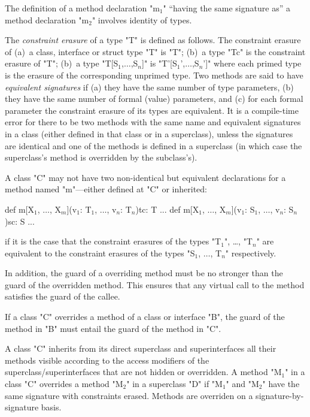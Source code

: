 The definition of a method declaration \xcdmath"m$_1$" ``having the same signature
as'' a method declaration \xcdmath"m$_2$" involves identity of types. 


The {\em constraint erasure} of a type \xcdmath"T" is defined as follows.
The constraint erasure of  (a)~a class, interface or struct type \xcdmath"T" is 
\xcdmath"T"; (b)~a type \xcdmath"T{c}" is the constraint erasure of 
\xcdmath"T"; (b)~a type \xcdmath"T[S$_1$,$\ldots$,S$_n$]" 
is \xcdmath"T'[S$_1$',$\ldots$,S$_n$']" where each primed type is the erasure of 
the corresponding unprimed type.
 Two methods are said to have {\em equivalent signatures} if (a) they have the
 same number of type parameters, 
(b) they have the same number of formal (value) parameters, and (c)
for each formal parameter the constraint erasure of its types are equivalent. It is a
compile-time error for there to be two methods with the same name and
equivalent signatures in a class (either defined in that class or in a
superclass), unless the signatures are identical and one of the methods is
defined in a superclass (in which case the superclass's method is overridden
by the subclass's).

 

A class \xcd"C" may not have two non-identical but equivalent 
declarations for
a method named 
\xcd"m"---either 
defined at \xcd"C" or inherited:
\begin{xtenmath}
def m[X$_1$, $\dots$, X$_m$](v$_1$: T$_1$, $\dots$, v$_n$: T$_n$){tc}: T {...}
def m[X$_1$, $\dots$, X$_m$](v$_1$: S$_1$, $\dots$, v$_n$: S$_n$){sc}: S {...}
\end{xtenmath}
\noindent
if it is the case that the constraint erasures of the types \xcdmath"T$_1$",
\dots, \xcdmath"T$_n$" are
equivalent to the constraint erasures of the types \xcdmath"S$_1$, $\dots$, T$_n$"
respectively.



In addition, the guard of a overriding method must be 
no stronger than the guard of the overridden method.   This
ensures that any virtual call to the method
satisfies the guard of the callee.


  If a class \xcd"C" overrides a method of a class or interface
  \xcd"B", the guard of the method in \xcd"B" must entail
  the guard of the method in \xcd"C".


A class \xcd"C" inherits from its direct superclass and superinterfaces all
their methods visible according to the access modifiers
of the superclass/superinterfaces that are not hidden or overridden. A method \xcdmath"M$_1$" in a class
\xcd"C" overrides
a method \xcdmath"M$_2$" in a superclass \xcd"D" if
\xcdmath"M$_1$" and \xcdmath"M$_2$" have the same signature with constraints erased.
Methods are overriden on a signature-by-signature basis.

